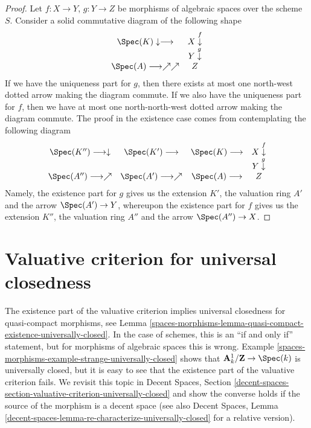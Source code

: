 \begin{proof}
Let $f : X \to Y$, $g : Y \to Z$ be morphisms of algebraic spaces over the
scheme $S$. Consider a solid commutative diagram of the following shape
$$
\begin{array}{cc}\Spec(K) \downarrow\longrightarrow & X \overset{f}{\downarrow} \\  & Y \overset{g}{\downarrow} \\ \Spec(A) \longrightarrow\nearrow\nearrow & Z\end{array}
$$
If we have the uniqueness part for $g$, then there exists at
most one north-west dotted arrow making the diagram commute.
If we also have the uniqueness part for $f$, then we have
at most one north-north-west dotted arrow making the diagram
commute. The proof in the existence case comes from contemplating
the following diagram
$$
\begin{array}{cccc}\Spec(K'') \longrightarrow\downarrow & \Spec(K') \longrightarrow & \Spec(K) \longrightarrow & X \overset{f}{\downarrow} \\  &  &  & Y \overset{g}{\downarrow} \\ \Spec(A'') \longrightarrow\nearrow & \Spec(A') \longrightarrow\nearrow & \Spec(A) \longrightarrow & Z\end{array}
$$
Namely, the existence part for $g$ gives us the extension $K'$, the
valuation ring $A'$ and the arrow $\Spec(A') \to Y$, whereupon
the existence part for $f$ gives us the extension $K''$, the
valuation ring $A''$ and the arrow $\Spec(A'') \to X$.
\end{proof}

\section{Valuative criterion for universal closedness}
\label{spaces-morphisms-section-valuative-criterion-universally-closed}
The existence part of the valuative criterion implies universal
closedness for quasi-compact morphisms, see
Lemma \ref{spaces-morphisms-lemma-quasi-compact-existence-universally-closed}.
In the case of schemes, this is an ``if and only if'' statement,
but for morphisms of algebraic spaces this is wrong.
Example \ref{spaces-morphisms-example-strange-universally-closed}
shows that $\mathbf{A}^1_k/\mathbf{Z} \to \Spec(k)$ is universally
closed, but it is easy to see that the existence part of
the valuative criterion fails. We revisit this topic in
Decent Spaces, Section
\ref{decent-spaces-section-valuative-criterion-universally-closed}
and show the converse holds if the source of the morphism is a decent space
(see also
Decent Spaces,
Lemma \ref{decent-spaces-lemma-re-characterize-universally-closed}
for a relative version).

